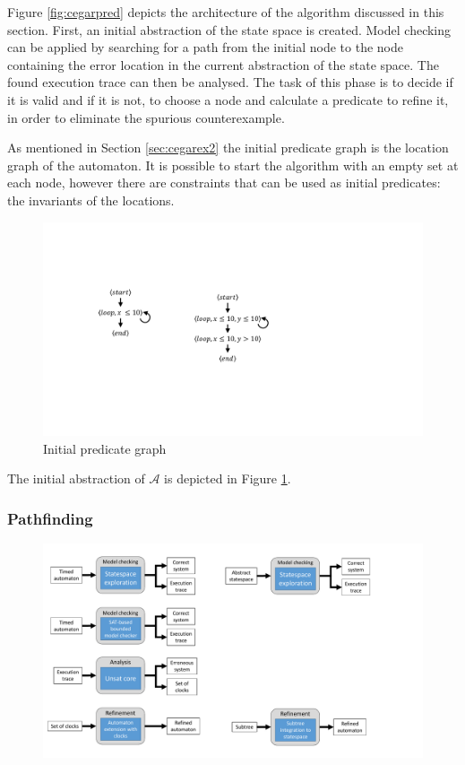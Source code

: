 Figure \ref{fig:cegarpred} depicts the architecture of the algorithm discussed in this section. First, an initial abstraction of the state space is created. Model checking can be applied by searching for a path from the initial node to the node containing the error location in the current abstraction of the state space.
The found execution trace can then be analysed. The task of this phase is to decide if it is valid and if it is not, to choose a node and calculate a predicate to refine it, in order to eliminate the spurious counterexample.

As mentioned in Section \ref{sec:cegarex2} the initial predicate graph is the location graph of the automaton. It is possible to start the algorithm with an empty set at each node, however there are constraints that can be used as initial predicates: the invariants of the locations.

\begin{figure} 
	\centering
	\includegraphics[width=.7\textwidth]{include/figures/runex_pred_init}
	\caption{Initial predicate graph}
	\label{fig:predinit}
\end{figure}

\begin{runningExample}
	The initial abstraction of $\mathcal{A}$ is depicted in Figure \ref{fig:predinit}.
\end{runningExample}

\subsubsection{Pathfinding}

\begin{figure}[h]
	\centering
	\includegraphics[width=.7\textwidth]{include/figures/modules_ssp_mc}
\end{figure}

